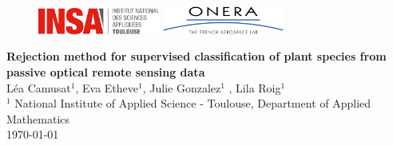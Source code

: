 \documentclass{siamart171218}
\begin{document}
\begin{center}
\begin{figure}[h]
    \begin{minipage}[c]{.46\linewidth}
        \centering
        \includegraphics[width=4cm]{insalogo.png} 
    \end{minipage}
    \hfill
    \begin{minipage}[c]{.46\linewidth}
        \centering
        \includegraphics[width=4cm]{ONERA_logo.png}
    \end{minipage}
\end{figure} 
\end{center}

\begin{center}
{\LARGE \textbf{Rejection method for supervised classification of plant species from passive optical remote sensing data}\\
[0.4cm] }
Léa Camusat$^1$, Eva Etheve$^1$, Julie Gonzalez$^1$ , Lila Roig$^1$ \\
$^1$ National Institute of Applied Science - Toulouse, Department of Applied Mathematics \\
\today
\end{center}
\newline \\[1cm]

\renewcommand{\abstractname}{Abstract}
\end{document}
